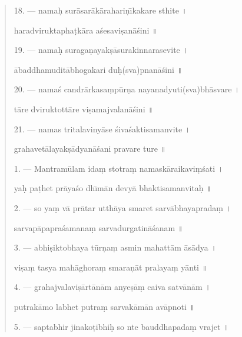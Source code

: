 \documentclass[a4paper, 11pt, oneside, french, landscape, twocolumn]{article}
\begin{document}
\begin{quotation}
\bigskip

18. --- nama\d{h} sur\={a}sar\={a}k\={a}rahari\d{n}\={\i}kakare sthite \texthindi{।}

haradviruktapha\d{t}k\={a}ra a\'{s}esavi\d{s}an\={a}\'{s}ini \texthindi{॥}

\bigskip

19. --- nama\d{h} suraga\d{n}ayak\d{s}\={a}surakinnarasevite \texthindi{।}

\={a}baddhamudit\={a}bhogakari du\d{h}(sva)pnan\={a}\'{s}ini \texthindi{॥}

\bigskip

20. --- nama\'{s} candr\={a}rkasa\d{m}p\={u}r\d{n}a nayanadyuti(sva)bh\={a}svare \texthindi{।}

t\={a}re dviruktott\={a}re vi\d{s}amajvalan\={a}\'{s}ini \texthindi{॥}

\bigskip

21. --- namas tritalaviny\={a}se \'{s}iva\'{s}aktisamanvite \texthindi{।}

grahavet\={a}layak\d{s}\={a}dyan\={a}\'{s}ani pravare ture \texthindi{॥}

\bigskip

\bigskip

1. --- Mantram\={u}lam ida\d{m} stotra\d{m} namask\={a}raikavi\d{m}\'{s}ati \texthindi{।}

ya\d{h} pa\d{t}het pr\={a}ya\'{s}o dh\={\i}m\={a}n devy\={a} bhaktisamanvita\d{h} \texthindi{॥}

\bigskip

2. --- so ya\d{m} v\={a} pr\={a}tar utth\={a}ya smaret sarv\={a}bhayaprada\d{m} \texthindi{।}

sarvap\={a}papra\'{s}amana\d{m} sarvadurgatin\={a}\'{s}anam \texthindi{॥}

\bigskip

3. --- abhi\d{s}iktobhaya t\={u}r\d{n}a\d{m} asmin mahatt\={a}m \={a}s\={a}dya \texthindi{।}

vi\d{s}a\d{m} tasya mah\={a}ghora\d{m} smara\d{n}\={a}t pralaya\d{m} y\={a}nti \texthindi{॥}

\bigskip

4. --- grahajvalavi\d{s}\={a}rt\={a}n\={a}m anye\d{s}\={a}\d{m} caiva satv\={a}n\={a}m \texthindi{।}

putrak\={a}mo labhet putra\d{m} sarvak\={a}m\={a}n av\={a}pnoti \texthindi{॥}

\bigskip

5. --- saptabhir jinako\d{t}ibhi\d{h} so nte bauddhapada\d{m} vrajet \texthindi{।}


\end{quotation}
\end{document}
